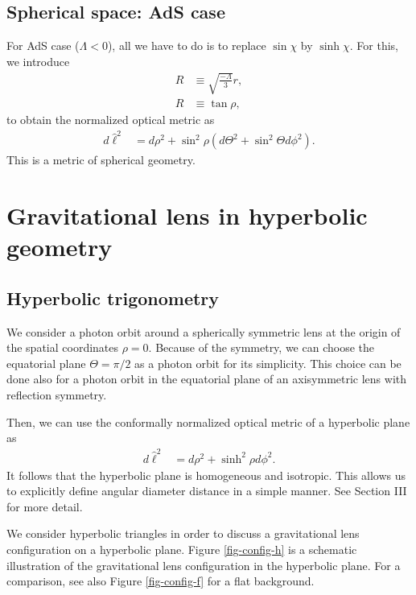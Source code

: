 \documentclass[twocolumn,showpacs,preprintnumbers,amsmath,amssymb]{revtex4-1}
\begin{document}
\subsection{Spherical space: AdS case}
For AdS case ($\Lambda < 0$), 
all we have to do is 
to replace $\sin\chi$ by $\sinh\chi$. 
For this, we introduce 
\cite{footnote-2}
\begin{align}
R &\equiv \sqrt{\frac{-\Lambda}{3}} r ,
\\
R&\equiv \tan\rho ,
\end{align}
to obtain the normalized optical metric as 
\begin{align}
d\hat\ell^2 
&= 
 d\rho^2
+ \sin^2\rho( d\Theta^2 + \sin^2 \Theta d\phi^2) . 
\label{optical-AdS}
\end{align}
This is a metric of spherical geometry. 





\section{Gravitational lens in hyperbolic geometry}
\subsection{Hyperbolic trigonometry}
We consider a photon orbit around a spherically symmetric lens 
at the origin of the spatial coordinates $\rho=0$. 
Because of the symmetry, we can choose the equatorial plane $\Theta = \pi/2$ 
as a photon orbit for its simplicity. 
This choice can be done also for a photon orbit 
in the equatorial plane of an axisymmetric lens 
with reflection symmetry. 

Then, we can use 
the conformally normalized optical metric of a hyperbolic plane as 
\begin{align}
d\hat\ell^2 
&= 
 d\rho^2
+ \sinh^2\rho d\phi^2 . 
\label{optical-equatorial}
\end{align}
It follows that the hyperbolic plane is homogeneous and isotropic. 
This allows us to explicitly define angular diameter distance 
in a simple manner. 
See Section III for more detail.

We consider hyperbolic triangles 
in order to discuss a gravitational lens configuration 
on a hyperbolic plane. 
Figure \ref{fig-config-h} is a schematic illustration 
of the gravitational lens configuration in the hyperbolic plane. 
For a comparison, see also Figure \ref{fig-config-f} 
for a flat background.
\end{document}
